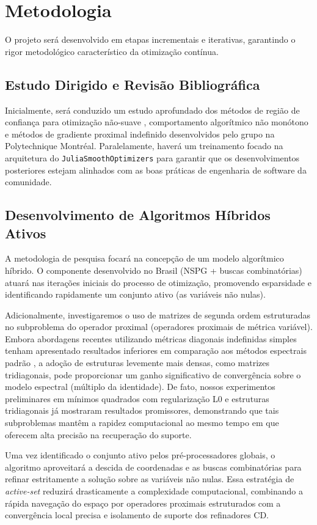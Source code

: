\section{Metodologia}

O projeto será desenvolvido em etapas incrementais e iterativas, garantindo o rigor metodológico característico da otimização contínua.

\subsection{Estudo Dirigido e Revisão Bibliográfica}
Inicialmente, será conduzido um estudo aprofundado dos métodos de região de confiança para otimização não-suave \cite{leconte2023complexity}, comportamento algorítmico não monótono e métodos de gradiente proximal indefinido \cite{Leconte_2024} desenvolvidos pelo grupo na Polytechnique Montréal. Paralelamente, haverá um treinamento focado na arquitetura do \texttt{JuliaSmoothOptimizers} para garantir que os desenvolvimentos posteriores estejam alinhados com as boas práticas de engenharia de software da comunidade.

\subsection{Desenvolvimento de Algoritmos Híbridos Ativos}
A metodologia de pesquisa focará na concepção de um modelo algorítmico híbrido. O componente desenvolvido no Brasil (NSPG + buscas combinatórias) atuará nas iterações iniciais do processo de otimização, promovendo esparsidade e identificando rapidamente um conjunto ativo (as variáveis não nulas). 

Adicionalmente, investigaremos o uso de matrizes de segunda ordem estruturadas no subproblema do operador proximal (operadores proximais de métrica variável). Embora abordagens recentes utilizando métricas diagonais indefinidas simples tenham apresentado resultados inferiores em comparação aos métodos espectrais padrão \cite{Leconte_2024}, a adoção de estruturas levemente mais densas, como matrizes tridiagonais, pode proporcionar um ganho significativo de convergência sobre o modelo espectral (múltiplo da identidade). De fato, nossos experimentos preliminares em mínimos quadrados com regularização L0 e estruturas tridiagonais já mostraram resultados promissores, demonstrando que tais subproblemas mantêm a rapidez computacional ao mesmo tempo em que oferecem alta precisão na recuperação do suporte.

Uma vez identificado o conjunto ativo pelos pré-processadores globais, o algoritmo aproveitará a descida de coordenadas e as buscas combinatórias para refinar estritamente a solução sobre as variáveis não nulas. Essa estratégia de \textit{active-set} reduzirá drasticamente a complexidade computacional, combinando a rápida navegação do espaço por operadores proximais estruturados com a convergência local precisa e isolamento de suporte dos refinadores CD.

